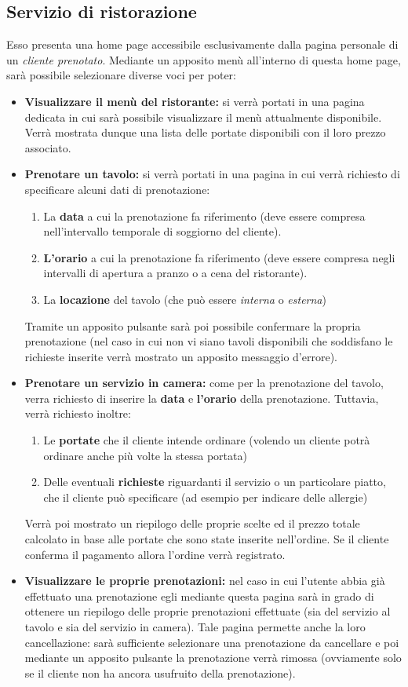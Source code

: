 \documentclass [a4paper, 12pt]{book}
\begin{document}
\subsection{Servizio di ristorazione}
\label{ServizioRistorazione}
Esso presenta una home page accessibile esclusivamente dalla pagina personale di un \textit{cliente prenotato}. Mediante un apposito menù all'interno di questa home page, sarà possibile selezionare diverse voci per poter:
\begin{itemize}
\item \textbf{Visualizzare il menù del ristorante:} si verrà portati in una pagina dedicata in cui sarà possibile visualizzare il menù attualmente disponibile. Verrà mostrata dunque una lista delle portate disponibili con il loro prezzo associato.
\item \textbf{Prenotare un tavolo:} si verrà portati in una pagina in cui verrà richiesto di specificare alcuni dati di prenotazione:
\begin{enumerate}
\item La \textbf{data} a cui la prenotazione fa riferimento (deve essere compresa nell'intervallo temporale di soggiorno del cliente).
\item \textbf{L'orario} a cui la prenotazione fa riferimento (deve essere compresa negli intervalli di apertura a pranzo o a cena del ristorante).
\item La \textbf{locazione} del tavolo (che può essere \textit{interna} o \textit{esterna})
\end{enumerate}
Tramite un apposito pulsante sarà poi possibile confermare la propria prenotazione (nel caso in cui non vi siano tavoli disponibili che soddisfano le richieste inserite verrà mostrato un apposito messaggio d'errore).
\item \textbf{Prenotare un servizio in camera:} come per la prenotazione del tavolo, verra richiesto di inserire la \textbf{data} e \textbf{l'orario} della prenotazione. Tuttavia, verrà richiesto inoltre:
\begin{enumerate}
\item Le \textbf{portate} che il cliente intende ordinare (volendo un cliente potrà ordinare anche più volte la stessa portata)
\item Delle eventuali \textbf{richieste} riguardanti il servizio o un particolare piatto, che il cliente può specificare (ad esempio per indicare delle allergie) 
\end{enumerate}
Verrà poi mostrato un riepilogo delle proprie scelte ed il prezzo totale calcolato in base alle portate che sono state inserite nell'ordine. Se il cliente conferma il pagamento allora l'ordine verrà registrato.
\item \textbf{Visualizzare le proprie prenotazioni:} nel caso in cui l'utente abbia già effettuato una prenotazione egli mediante questa pagina sarà in grado di ottenere un riepilogo delle proprie prenotazioni effettuate (sia del servizio al tavolo e sia del servizio in camera). Tale pagina permette anche la loro cancellazione: sarà sufficiente selezionare una prenotazione da cancellare e poi mediante un apposito pulsante la prenotazione verrà rimossa (ovviamente solo se il cliente non ha ancora usufruito della prenotazione).
\end{itemize} 
\end{document}
